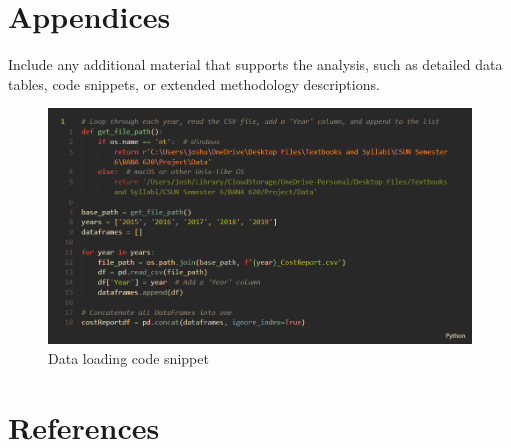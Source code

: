 \documentclass{article}
\theoremstyle{mytheoremstyle}
\theoremstyle{mytheoremstyle}
\theoremstyle{myproblemstyle}
\begin{document}
\section{Appendices}
Include any additional material that supports the analysis, such as detailed data tables, code snippets, or extended methodology descriptions.

\begin{figure}[htbp]
\centering
\includegraphics[width=\linewidth]{./Images/dataLoadingSnippet.png}
\caption{Data loading code snippet}
\label{fig:screenshot_label}
\end{figure}


\pagebreak
\section{References}
\end{document}

